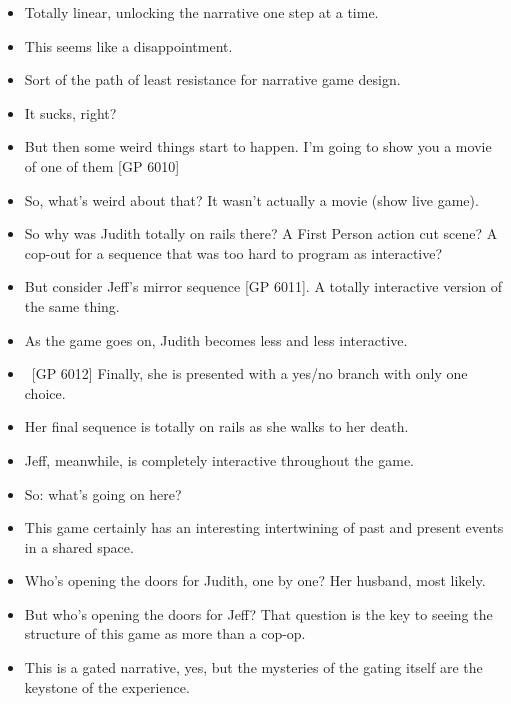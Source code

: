 \documentclass[12pt]{article}
\begin{document}
{\begin{itemize}
\item Totally linear, unlocking the narrative one step at a time.

\item This seems like a disappointment.

\item Sort of the path of least resistance for narrative game design.

\item It sucks, right?

\item But then some weird things start to happen.  I'm going to show you a movie of one of them [GP 6010]

\item So, what's weird about that?  It wasn't actually a movie (show live game).
\item So why was Judith totally on rails there?  A First Person action cut scene?  A cop-out for a sequence that was too hard to program as interactive?

\item But consider Jeff's mirror sequence [GP 6011].  A totally interactive version of the same thing.

\item As the game goes on, Judith becomes less and less interactive.

\item \ [GP 6012] Finally, she is presented with a yes/no branch with only one choice.

\item Her final sequence is totally on rails as she walks to her death.

\item Jeff, meanwhile, is completely interactive throughout the game.

\item So:  what's going on here?

\item This game certainly has an interesting intertwining of past and present events in a shared space.  

\item Who's opening the doors for Judith, one by one?  Her husband, most likely.
\item But who's opening the doors for Jeff?  That question is the key to seeing the structure of this game as more than a cop-op.

\item This is a gated narrative, yes, but the mysteries of the gating itself are the keystone of the experience.


\end{itemize}}
\end{document}
